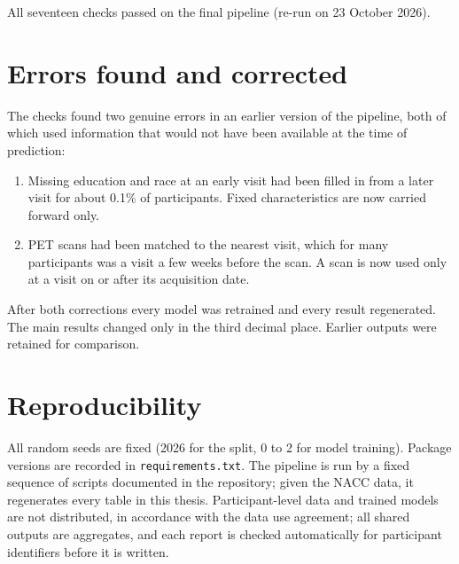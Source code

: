 All seventeen checks passed on the final pipeline (re-run on 23 October 2026).

\section{Errors found and corrected}

The checks found two genuine errors in an earlier version of the pipeline, both of which used information that would not have been available at the time of prediction:

\begin{enumerate}
\item Missing education and race at an early visit had been filled in from a later visit for about 0.1\% of participants. Fixed characteristics are now carried forward only.
\item PET scans had been matched to the nearest visit, which for many participants was a visit a few weeks before the scan. A scan is now used only at a visit on or after its acquisition date.
\end{enumerate}

After both corrections every model was retrained and every result regenerated. The main results changed only in the third decimal place. Earlier outputs were retained for comparison.

\section{Reproducibility}

All random seeds are fixed (2026 for the split, 0 to 2 for model training). Package versions are recorded in \texttt{requirements.txt}. The pipeline is run by a fixed sequence of scripts documented in the repository; given the NACC data, it regenerates every table in this thesis. Participant-level data and trained models are not distributed, in accordance with the data use agreement; all shared outputs are aggregates, and each report is checked automatically for participant identifiers before it is written.
